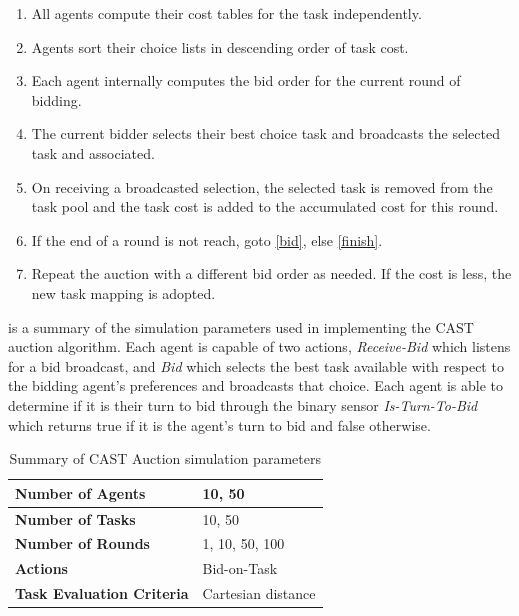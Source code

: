 \begin{enumerate}
\item All agents compute their cost tables for the task independently.

\item  Agents sort their choice lists in descending order of task cost.
  
\item Each agent internally computes the bid order for the current round of bidding.
  
\item \label{bid} The current bidder selects their best choice task and broadcasts the selected task and associated. 
  
\item On receiving a broadcasted selection, the selected task is removed from the task pool and the task cost is added to the accumulated cost for this round.
  
\item If the end of a round is not reach, goto \ref{bid}, else \ref{finish}.
  
\item \label{finish} Repeat the auction with a different bid order as needed.  If the cost is less, the new task mapping is adopted.
\end{enumerate}

 is a summary of the simulation parameters used in implementing the CAST auction algorithm.  Each agent is capable of two actions, \emph{Receive-Bid} which listens for a bid broadcast, and \emph{Bid} which selects the best task available with respect to the bidding agent's preferences and broadcasts that choice.  Each agent is able to determine if it is their turn to bid through the binary sensor \emph{Is-Turn-To-Bid} which returns true if it is the agent's turn to bid and false otherwise.

\begin{table}[ht]
  \centering
  \begin{tabular}{|l|l|}
    \hline
    \textbf{Number of Agents} & 10, 50 \\
    \hline
    \textbf{Number of Tasks} & 10, 50 \\
    \hline
    \textbf{Number of Rounds} & 1, 10, 50, 100 \\
    \hline
    \textbf{Actions} & Bid-on-Task \\
    \hline
    \textbf{Task Evaluation Criteria} & Cartesian distance \\
    \hline
  \end{tabular}
	
  \caption{Summary of CAST Auction simulation parameters}
  \label{tab:CastParameters}
\end{table}

